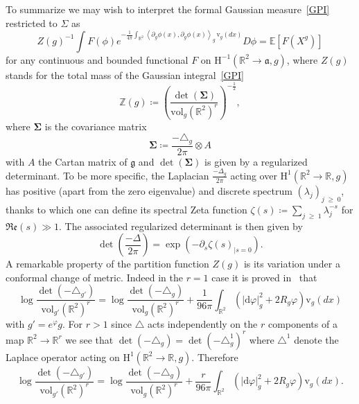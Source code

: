 \documentclass[10pt]{amsart}
\theoremstyle{definition}\newtheorem{defi}[theo]{Definition}\newtheorem{rema}[theo]{Remark}\newtheorem{exam}[theo]{Example}\newtheorem{exem}[theo]{Example}\newtheorem{nota}[theo]{Notation}
\renewcommand{\geq}{\;\geqslant\;}
\newcommand{\dd}{\mathrm{d}}
\newcommand{\frkg}{\mathfrak{g}}
\newcommand{\frka}{\mathfrak{a}}
\newcommand{\frkRe}{\mathfrak{Re}}
\newcommand{\vol}{\mathrm{vol}}
\newcommand{\rmv}{\mathrm{v}}
\newcommand{\rmH}{\mathrm{H}}
\newcommand{\R}{\mathbb{R}}
\newcommand{\Z}{\mathbb{Z}}
\newcommand{\E}{\mathbb{E}}
\newcommand{\norm}[1]{\left\lvert#1\right\rvert}
\begin{document}
To summarize we may wish to interpret the formal Gaussian measure~\eqref{GPI} restricted to $\Sigma$ as
\begin{equation*}\label{def:GPIr}
Z(g)^{-1}\int F(\phi)e^{-\frac{1}{4\pi}\int_{\R^2} \left\langle\partial_{g} \phi(x), \partial_{g} \phi(x) \right\rangle_{g}\,\rmv_{g}(dx) }D\phi=\E\left[F\left(X^g\right)\right]
\end{equation*}
for any continuous and bounded functional $F$ on $\rmH^{-1}(\R^2\to \frka,g)$, where $Z(g)$ stands for the total mass of the Gaussian integral~\eqref{GPI}
\begin{equation*}
\Z(g)\coloneqq \left(\frac{\det (\bm\Sigma)}{\vol_g(\R^2)^r}\right)^{-\frac12},
\end{equation*}
where $ \bm\Sigma$ is the covariance matrix
\begin{equation}
\bm\Sigma\coloneqq\frac{-\triangle_{g}}{2\pi}\otimes A
\end{equation}
with $A$ the Cartan matrix of $\frkg$ and $ \det (\bm\Sigma)$ is given by a regularized determinant. To be more specific, the Laplacian $\frac{-\Delta_g}{2\pi}$ acting over $\rmH^{1}(\R^2\to\R,g)$ has positive (apart from the zero eigenvalue) and discrete spectrum $(\lambda_j)_{j\geq 0}$, thanks to which one can define its spectral Zeta function $\zeta(s)\coloneqq \sum_{j\geq 1}\lambda_j^{-s}$ for $\frkRe(s)\gg1$. The associated regularized determinant is then given by
\[
\det\left(\frac{-\Delta}{2\pi}\right)=\exp\left(-\partial_{s}\zeta(s)_{\vert s=0}\right).
\]
A remarkable property of the partition function $Z(g)$ is its variation under a conformal change of metric. Indeed in the $r=1$ case it is proved in~\cite[Equation (1.13)]{OPS88} that
\begin{equation*}
\log \frac{\det\left(-\triangle_{g'}\right)}{\vol_{g'}(\R^2)^r}=\log \frac{\det\left(-\triangle_{g}\right)}{\vol_g\left(\R^2\right)^r}+\frac{1}{96\pi}\int_{\R^2}\left(\norm{\dd \varphi}^2_g+2R_g\varphi\right)\rmv_{g}(dx)
\end{equation*}
with $g'=e^{\varphi}g$. For $r>1$ since $\triangle$ acts independently on the $r$ components of a map $\R^2\to\R^r$ we see that $\det(-\triangle_{g})=\det(-\triangle^1_{g})^r$ where $\triangle^1$ denote the Laplace operator acting on $\rmH^{1}(\R^2\to\R,g)$. Therefore
\begin{equation}
\log \frac{\det\left(-\triangle_{g'}\right)}{\vol_{g'}\left(\R^2\right)^r}=\log \frac{\det\left(-\triangle_{g}\right)}{\vol_g\left(\R^2\right)^r}+\frac{r}{96\pi}\int_{\R^2}\left(\norm{\dd \varphi}^2_g+2R_g\varphi\right)\rmv_{g}(dx).
\end{equation}
\end{document}
